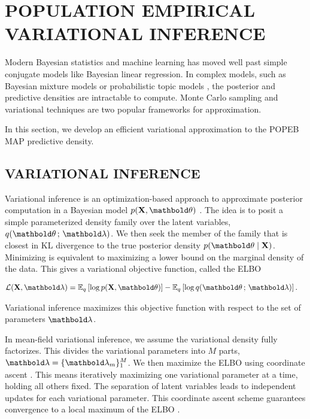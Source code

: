 
\section{POPULATION EMPIRICAL VARIATIONAL INFERENCE}

Modern Bayesian statistics and machine learning has moved well past
simple conjugate models like Bayesian linear regression. In
complex models, such as Bayesian mixture
models \citep{bishop2006pattern} or probabilistic topic models
\citep{blei2003latent}, the posterior and predictive densities are intractable
to compute. Monte Carlo sampling and variational techniques are two popular
frameworks for approximation.

In this section, we develop an efficient  variational
approximation to the \gls{POPEB} \gls{MAP} predictive density.

\subsection{VARIATIONAL INFERENCE}

Variational inference is an optimization-based approach to
approximate posterior computation in a Bayesian model $p(\mbX,\mbtheta)$
\citep{jordan1999introduction, wainwright2008graphical}.
The idea is to posit a simple parameterized density family
over the latent variables, $q(\mbtheta \,;\, \mblambda)$. We then seek the
member of the family that is closest in \gls{KL} divergence to the true
posterior density $p (\mbtheta\mid\mbX)$.
Minimizing  is equivalent to maximizing a lower bound
on the marginal density of the data. This gives a
variational objective function, called the \gls{ELBO}
\begin{linenomath}
\begin{align*}
  \cL(\mbX, \mblambda)
  &=
  \E_q
  \left[
    \log p(\mbX,\mbtheta)
  \right]
  -
  \E_q
  \left[
    \log q(\mbtheta \,;\, \mblambda)
  \right].
\end{align*}
\end{linenomath}
Variational inference maximizes this objective function with respect to the set
of parameters $\mblambda$.

In mean-field variational inference, we assume the variational
density fully factorizes. This divides the variational parameters into $M$
parts,
$\mblambda = \{\mblambda_m\}_1^M$. We then maximize the \gls{ELBO}
using coordinate ascent \citep{jordan1999introduction}.
This means iteratively maximizing one variational
parameter at a time, holding all others fixed.
The separation of latent variables leads to independent updates for each
variational parameter.
This coordinate ascent scheme guarantees convergence to a local
maximum of the \gls{ELBO} \citep{bishop2006pattern}.

